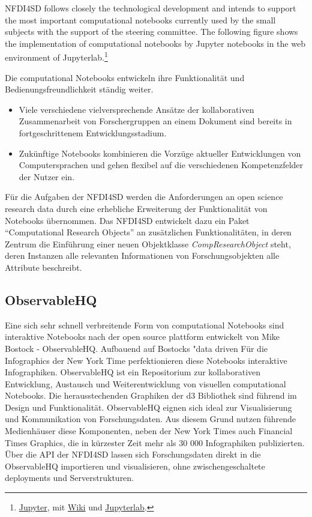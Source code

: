 \documentclass[
  english,
  paper=a4,
  oneside,captions=tableheading
]{scrbook}
\providecommand{\tightlist}{%
  \setlength{\itemsep}{0pt}\setlength{\parskip}{0pt}}
\begin{document}
NFDI4SD follows closely the technological development and intends to
support the most important computational notebooks currently used by the
small subjects with the support of the steering committee. The following
figure shows the implementation of computational notebooks by Jupyter
notebooks in the web environment of Jupyterlab.\footnote{\href{https://jupyter.org/}{Jupyter},
  mit \href{https://en.wikipedia.org/wiki/Project_Jupyter}{Wiki} und
  \href{https://jupyterlab.readthedocs.io/en/stable/}{Jupyterlab}.}

Die computational Notebooks entwickeln ihre Funktionalität und
Bedienungsfreundlichkeit ständig weiter.

\begin{itemize}
\tightlist
\item
  Viele verschiedene vielversprechende Ansätze der kollaborativen
  Zusammenarbeit von Forschergruppen an einem Dokument sind bereits in
  fortgeschrittenem Entwicklungsstadium.
\item
  Zukünftige Notebooks kombinieren die Vorzüge aktueller Entwicklungen
  von Computersprachen und gehen flexibel auf die verschiedenen
  Kompetenzfelder der Nutzer ein.
\end{itemize}

Für die Aufgaben der NFDI4SD werden die Anforderungen an open science
research data durch eine erhebliche Erweiterung der Funktionalität von
Notebooks übernommen. Das NFDI4SD entwickelt dazu ein Paket
``Computational Research Objects'' an zusätzlichen Funktionalitäten, in
deren Zentrum die Einführung einer neuen Objektklasse
\emph{CompResearchObject} steht, deren Instanzen alle relevanten
Informationen von Forschungsobjekten alle Attribute beschreibt.

\hypertarget{observablehq}{%
\subsection{ObservableHQ}\label{observablehq}}

Eine sich sehr schnell verbreitende Form von computational Notebooks
sind interaktive Notebooks nach der open source plattform entwickelt von
Mike Bostock - ObservableHQ. Aufbauend auf Bostocks "data driven Für die
Infographics der New York Time perfektionieren diese Notebooks
interaktive Infographiken. ObservableHQ ist ein Repositorium zur
kollaborativen Entwicklung, Austausch und Weiterentwicklung von
visuellen computational Notebooks. Die herausstechenden Graphiken der d3
Bibliothek sind führend im Design und Funktionalität. ObservableHQ
eignen sich ideal zur Visualisierung und Kommunikation von
Forschungsdaten. Aus diesem Grund nutzen führende Medienhäuser diese
Komponenten, neben der New York Times auch Financial Times Graphics, die
in kürzester Zeit mehr als 30 000 Infographiken publizierten. Über die
API der NFDI4SD lassen sich Forschungsdaten direkt in die ObservableHQ
importieren und visualisieren, ohne zwischengeschaltete deployments und
Serverstrukturen.
\end{document}
